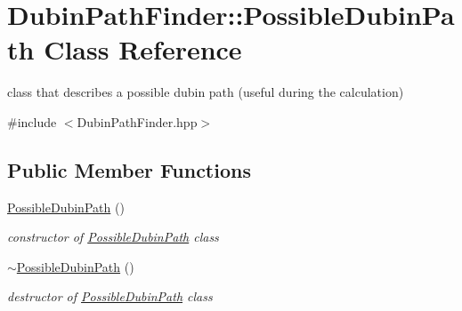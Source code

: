 \hypertarget{class_dubin_path_finder_1_1_possible_dubin_path}{}\section{Dubin\+Path\+Finder\+:\+:Possible\+Dubin\+Path Class Reference}
\label{class_dubin_path_finder_1_1_possible_dubin_path}


class that describes a possible dubin path (useful during the calculation)  




{\ttfamily \#include $<$Dubin\+Path\+Finder.\+hpp$>$}

\subsection*{Public Member Functions}
\begin{DoxyCompactItemize}
\item 
\mbox{\label{class_dubin_path_finder_1_1_possible_dubin_path_af83aca2f73102bedaea8cc09aff05ad9}} 
\mbox{\hyperlink{class_dubin_path_finder_1_1_possible_dubin_path_af83aca2f73102bedaea8cc09aff05ad9}{Possible\+Dubin\+Path}} ()
\begin{DoxyCompactList}\small\item\em constructor of \mbox{\hyperlink{class_dubin_path_finder_1_1_possible_dubin_path}{Possible\+Dubin\+Path}} class \end{DoxyCompactList}\item 
\mbox{\label{class_dubin_path_finder_1_1_possible_dubin_path_a5312073fbe4725d392fe5a7520cac0ba}} 
\mbox{\hyperlink{class_dubin_path_finder_1_1_possible_dubin_path_a5312073fbe4725d392fe5a7520cac0ba}{$\sim$\+Possible\+Dubin\+Path}} ()
\begin{DoxyCompactList}\small\item\em destructor of \mbox{\hyperlink{class_dubin_path_finder_1_1_possible_dubin_path}{Possible\+Dubin\+Path}} class \end{DoxyCompactList}\end{DoxyCompactItemize}
